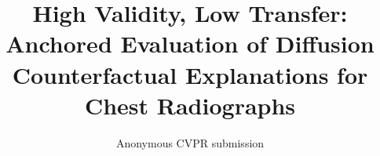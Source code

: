 \documentclass[10pt,twocolumn,letterpaper]{article}
\title{High Validity, Low Transfer: Anchored Evaluation of Diffusion Counterfactual Explanations for Chest Radiographs}
\author{Anonymous CVPR submission}
\begin{document}
\maketitlesupplementary

\clearpage

\end{document}
